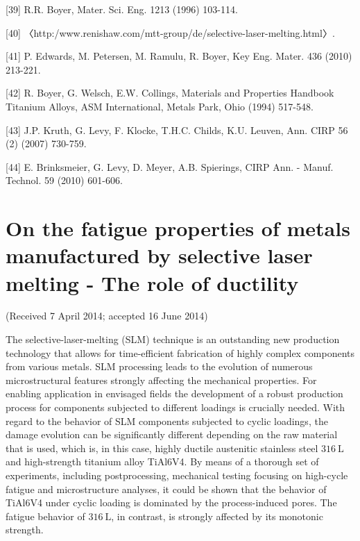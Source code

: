 \documentclass[10pt]{article}
\begin{document}
[39] R.R. Boyer, Mater. Sci. Eng. 1213 (1996) 103-114.

[40] 〈http:/www.renishaw.com/mtt-group/de/selective-laser-melting.html〉.

[41] P. Edwards, M. Petersen, M. Ramulu, R. Boyer, Key Eng. Mater. 436 (2010) 213-221.

[42] R. Boyer, G. Welsch, E.W. Collings, Materials and Properties Handbook Titanium Alloys, ASM International, Metals Park, Ohio (1994) 517-548.

[43] J.P. Kruth, G. Levy, F. Klocke, T.H.C. Childs, K.U. Leuven, Ann. CIRP 56 (2) (2007) 730-759.

[44] E. Brinksmeier, G. Levy, D. Meyer, A.B. Spierings, CIRP Ann. - Manuf. Technol. 59 (2010) 601-606.

\section*{On the fatigue properties of metals manufactured by selective laser melting - The role of ductility }
(Received 7 April 2014; accepted 16 June 2014)

The selective-laser-melting (SLM) technique is an outstanding new production technology that allows for time-efficient fabrication of highly complex components from various metals. SLM processing leads to the evolution of numerous microstructural features strongly affecting the mechanical properties. For enabling application in envisaged fields the development of a robust production process for components subjected to different loadings is crucially needed. With regard to the behavior of SLM components subjected to cyclic loadings, the damage evolution can be significantly different depending on the raw material that is used, which is, in this case, highly ductile austenitic stainless steel $316 \mathrm{~L}$ and high-strength titanium alloy TiAl6V4. By means of a thorough set of experiments, including postprocessing, mechanical testing focusing on high-cycle fatigue and microstructure analyses, it could be shown that the behavior of TiAl6V4 under cyclic loading is dominated by the process-induced pores. The fatigue behavior of $316 \mathrm{~L}$, in contrast, is strongly affected by its monotonic strength.
\end{document}
